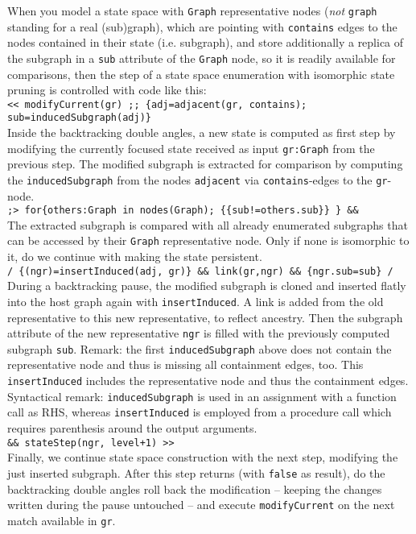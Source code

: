 \begin{example}
When you model a state space with \texttt{Graph} representative nodes (\emph{not} \texttt{graph} standing for a real (sub)graph), which are pointing with \texttt{contains} edges to the nodes contained in their state (i.e. subgraph), and store additionally a replica of the subgraph in a \texttt{sub} attribute of the \texttt{Graph} node, so it is readily available for comparisons,
then the step of a state space enumeration with isomorphic state pruning is controlled with code like this:\\
\verb#<< modifyCurrent(gr) ;; {adj=adjacent(gr, contains); sub=inducedSubgraph(adj)}#\\
Inside the backtracking double angles, a new state is computed as first step by modifying the currently focused state received as input \texttt{gr:Graph} from the previous step. The modified subgraph is extracted for comparison by computing the \texttt{inducedSubgraph} from the nodes \texttt{adjacent} via \texttt{contains}-edges to the \texttt{gr}-node.\\
\verb#;> for{others:Graph in nodes(Graph); {{sub!=others.sub}} } && #\\
The extracted subgraph is compared with all already enumerated subgraphs that can be accessed by their \texttt{Graph} representative node. Only if none is isomorphic to it, do we continue with making the state persistent.\\
\verb#/ {(ngr)=insertInduced(adj, gr)} && link(gr,ngr) && {ngr.sub=sub} /#\\
During a backtracking pause, the modified subgraph is cloned and inserted flatly into the host graph again with \texttt{insertInduced}. A link is added from the old representative to this new representative, to reflect ancestry. Then the subgraph attribute of the new representative \texttt{ngr} is filled with the previously computed subgraph \texttt{sub}. Remark: the first \texttt{inducedSubgraph} above does not contain the representative node and thus is missing all containment edges, too. This \texttt{insertInduced} includes the representative node and thus the containment edges. Syntactical remark: \texttt{inducedSubgraph} is used in an assignment with a function call as RHS, whereas \texttt{insertInduced} is employed from a procedure call which requires parenthesis around the output arguments.\\
\verb#&& stateStep(ngr, level+1) >>#\\
Finally, we continue state space construction with the next step, modifying the just inserted subgraph.
After this step returns (with \texttt{false} as result), do the backtracking double angles roll back the modification -- keeping the changes written during the pause untouched -- and execute \texttt{modifyCurrent} on the next match available in \texttt{gr}.
\end{example}

